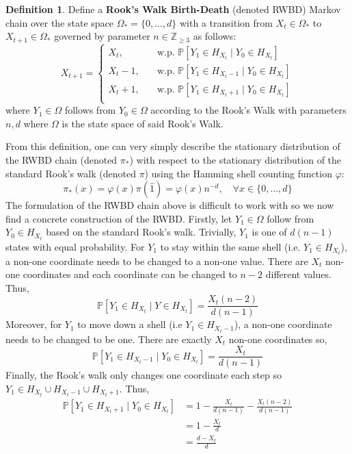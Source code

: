 \documentclass{article}
\theoremstyle{definition}
\newtheorem{definition}{Definition}
\theoremstyle{definition}
\theoremstyle{definition}
\theoremstyle{definition}
\theoremstyle{named}
\begin{document}
\begin{definition}
   \label{BDRW}
  Define a {\bf Rook's Walk Birth-Death} (denoted RWBD) Markov chain over the state space $\Omega_* = \{0,\dots , d\}$ with a transition from $X_t \in \Omega_*$ to $X_{t+1}\in \Omega_*$ governed by parameter $n\in \mathbb{Z}_{\geq 3}$ as follows:
  \[X_{t+1}=\begin{cases}
   X_t, \quad&\text{w.p. } \mathbb{P}[Y_1 \in H_{X_t} \mid Y_0\in H_{X_t}] \\
   X_t-1, \quad&\text{w.p. } \mathbb{P}[Y_1 \in H_{X_t-1} \mid Y_0\in H_{X_t}]\\
   X_t+1, \quad&\text{w.p. } \mathbb{P}[Y_1 \in H_{X_t+1} \mid Y_0\in H_{X_t}] \\
  \end{cases}\]
  where $Y_1\in \Omega$ follows from $Y_0\in \Omega$ according to the Rook's Walk with parameters $n,d$ where $\Omega$ is the state space of said Rook's Walk.

\end{definition}
 \noindent From this definition, one can very simply describe the stationary distribution of the RWBD chain (denoted $\pi_*$) with respect to the stationary distribution of the standard Rook's walk (denoted $\pi$) using the Hamming shell counting function $\varphi$:
     \[\pi_*(x) = \varphi(x)\pi(\hat{1}) = \varphi(x)n^{-d},\quad\forall x\in \{0,\dots,d\}\]
  The formulation of the RWBD chain above is difficult to work with so we now find a concrete construction of the RWBD. Firstly, let $Y_1\in \Omega$ follow from $Y_0\in H_{X_t}$ based on the standard Rook's walk. Trivially, $Y_1$ is one of $d(n-1)$ states with equal probability. For $Y_1$ to stay within the same shell (i.e. $Y_1\in H_{X_t}$), a non-one coordinate needs to be changed to a non-one value. There are $X_t$ non-one coordinates and each coordinate can be changed to $n-2$ different values. Thus,
  \[\mathbb{P}[Y_1 \in H_{X_t} \mid Y\in H_{X_t}] = \frac{X_t(n-2)}{d(n-1)}\]
Moreover, for $Y_1$ to move down a shell (i.e $Y_1\in H_{X_t-1}$), a non-one coordinate needs to be changed to be one. There are exactly $X_t$ non-one coordinates so,
  \[\mathbb{P}[Y_1 \in H_{X_t-1} \mid Y_0\in H_{X_t}] = \frac{X_t}{d(n-1)}\]
  Finally, the Rook's walk only changes one coordinate each step so $Y_1\in H_{X_t}\cup H_{X_t-1} \cup H_{X_t+1}$. Thus,
  \begin{align*}
  \mathbb{P}[Y_1 \in H_{X_t+1} \mid Y_0\in H_{X_t}] &= 1 - \frac{X_t}{d(n-1)} - \frac{X_t(n-2)}{d(n-1)}\\
  &= 1 -  \frac{X_t}{d}\\
  &= \frac{d-X_t}{d}
  \end{align*}
\end{document}
